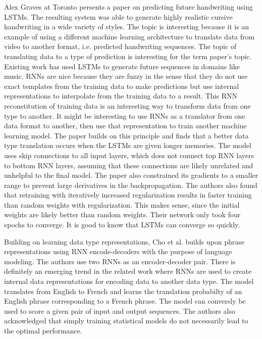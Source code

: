 Alex Graves at Toronto persents a paper on predicting future handwriting using LSTMs.  The resulting system was able to generate highly realistic cursive handwriting in a wide variety of styles.  The topic is interesting because it is an example of using a different machine learning architecture to translate data from video to another format, i.e. predicted handwriting sequences.  The topic of translating data to a type of prediction is interesting for the term paper's topic.  Existing work has used LSTMs to generate future sequences in domains like music.  RNNs are nice because they are fuzzy in the sense that they do not use exact templates from the training data to make predictions but use internal representations to interpolate from the training data to a result.  This RNN reconstitution of training data is an interesting way to transform data from one type to another.  It might be interesting to use RNNs as a translator from one data format to another, then use that representation to train another machine learning model.  The paper builds on this principle and finds that a better data type translation occurs when the LSTMs are given longer memories.  The model uses skip connections to all input layers, which does not connect top RNN layers to bottom RNN layers, assuming that these connections are likely unrelated and unhelpful to the final model.  The paper also constrained its gradients to a smaller range to prevent large derivatives in the backpropagation.  The authors also found that retraining with iteratively increased regularization results in faster training than random weights with regularization.  This makes sense, since the initial weights are likely better than random weights.  Their network only took four epochs to converge.  It is good to know that LSTMs can converge so quickly.

Building on learning data type representations, Cho et al. builds upon phrase representations using RNN encode-decoders with the purpose of language modeling.  The authors use two RNNs as an encoder-decoder pair.  There is definitely an emerging trend in the related work where RNNs are used to create internal data representations for encoding data to another data type.  The model translates from English to French and learns the translation probabilty of an English phrase corresponding to a French phrase.  The model can conversly be used to score a given pair of input and output sequences. The authors also acknowledged that simply training statistical models do not necessarily lead to the optimal performance.


